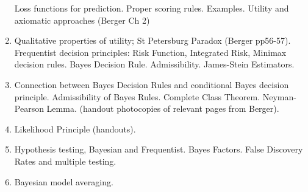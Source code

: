 \begin{enumerate}
Loss functions for prediction. Proper scoring rules. Examples.
Utility and axiomatic approaches (Berger Ch 2)
\item Qualitative properties of utility; St Petersburg Paradox (Berger pp56-57). Frequentist decision principles: Risk Function, Integrated Risk, Minimax decision rules. Bayes Decision Rule. Admissibility. James-Stein Estimators. 
\item Connection between Bayes Decision Rules and conditional Bayes decision principle. Admissibility of Bayes Rules. Complete Class Theorem. Neyman-Pearson Lemma. (handout photocopies of relevant pages from Berger). 
\item Likelihood Principle (handouts).  %
\item Hypothesis testing, Bayesian and Frequentist. Bayes Factors. False Discovery Rates and multiple testing.
\item Bayesian model averaging.
\end{enumerate}

